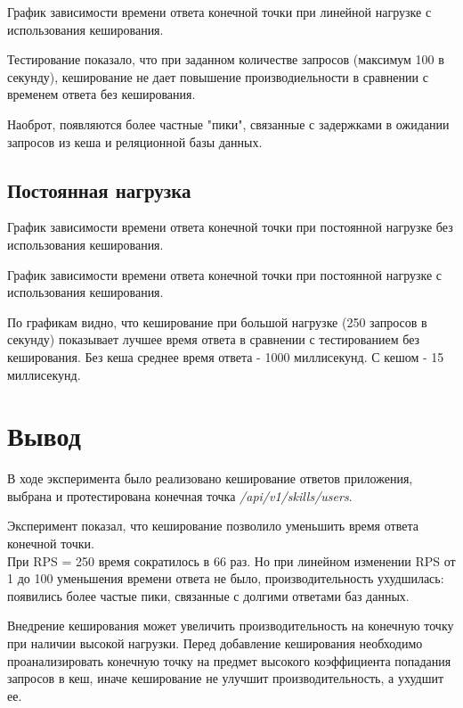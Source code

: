 \newpage

График зависимости времени ответа конечной точки при линейной нагрузке с использования кеширования.   

Тестирование показало, что при заданном количестве запросов (максимум 100 в секунду), кеширование не дает повышение производиельности в сравнении с временем ответа без кеширования. 
 
Наоброт, появляются более частные "пики", связанные с задержками в ожидании запросов из кеша и реляционной базы данных.  

\newpage
\subsection{Постоянная нагрузка}

График зависимости времени ответа конечной точки при постоянной нагрузке без использования кеширования.   
\newpage

График зависимости времени ответа конечной точки при постоянной нагрузке с использования кеширования.   

По графикам видно, что кеширование при большой нагрузке (250 запросов в секунду) показывает лучшее время ответа в сравнении с тестированием без кеширования. 
Без кеша среднее время ответа - 1000 миллисекунд.  
С кешом - 15 миллисекунд.  

\newpage

\section*{Вывод}

В ходе эксперимента было реализовано кеширование ответов приложения, выбрана и протестирована конечная точка \textit{/api/v1/skills/users}.

Эксперимент показал, что кеширование позволило уменьшить время ответа конечной точки.\\
При RPS = 250 время сократилось в 66 раз. Но при линейном изменении RPS от 1 до 100 уменьшения времени ответа не было, производительность ухудшилась: появились более частые пики, связанные с долгими ответами баз данных.  

Внедрение кеширования может увеличить производительность на конечную точку при наличии высокой нагрузки.  
Перед добавление кеширования необходимо проанализировать конечную точку на предмет высокого коэффициента попадания запросов в кеш, иначе кеширование не улучшит производительность, а ухудшит ее.  
